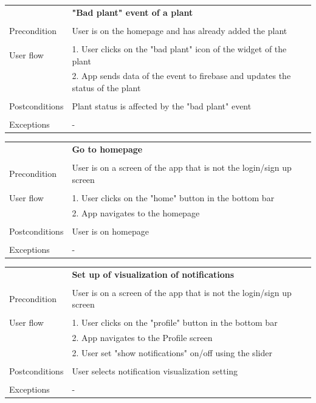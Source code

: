 \documentclass[10pt]{article}
\begin{document}
    \newline
    \newline
    \newline
    \begin{tabular}{ p{3cm}|p{8cm} }
     & \textbf{"Bad plant" event of a plant} \\
     \\
     Precondition & User is on the homepage and has already added the plant \\ 
     \\
     User flow 
     & 1. User clicks on the "bad plant" icon of the widget of the plant \\
     & 2. App sends data of the event to firebase and updates the status of the plant \\ 
     \\
     Postconditions & Plant status is affected by the "bad plant" event \\
     \\
     Exceptions & -\\
    \end{tabular}
    \newline
    \newline
    \newline
    \begin{tabular}{ p{3cm}|p{8cm} }
     & \textbf{Go to homepage} \\
     \\
     Precondition & User is on a screen of the app that is not the login/sign up screen \\ 
     \\
     User flow 
     & 1. User clicks on the "home" button in the bottom bar  \\
     & 2. App navigates to the homepage \\ 
     \\
     Postconditions & User is on homepage \\
     \\
     Exceptions & -\\
    \end{tabular}
    \newline
    \newline
    \newline
    \begin{tabular}{ p{3cm}|p{8cm} }
     & \textbf{Set up of visualization of notifications} \\
     \\
     Precondition & User is on a screen of the app that is not the login/sign up screen \\ 
     \\
     User flow 
     & 1. User clicks on the "profile" button in the bottom bar  \\
     & 2. App navigates to the Profile screen \\ 
     & 2. User set "show notifications" on/off using the slider \\ 
     \\
     Postconditions & User selects notification visualization  setting \\
     \\
     Exceptions & -\\
    \end{tabular}
\end{document}
